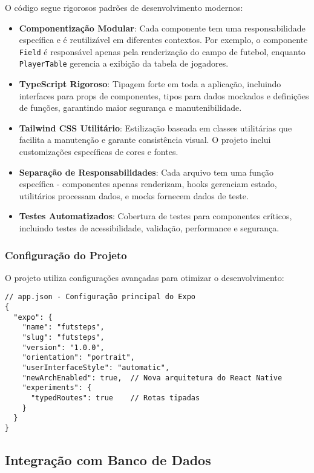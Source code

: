 O código segue rigorosos padrões de desenvolvimento modernos:

\begin{itemize}
    \item \textbf{Componentização Modular}: Cada componente tem uma responsabilidade específica e é reutilizável em diferentes contextos. Por exemplo, o componente \texttt{Field} é responsável apenas pela renderização do campo de futebol, enquanto \texttt{PlayerTable} gerencia a exibição da tabela de jogadores.
    
    \item \textbf{TypeScript Rigoroso}: Tipagem forte em toda a aplicação, incluindo interfaces para props de componentes, tipos para dados mockados e definições de funções, garantindo maior segurança e manutenibilidade.
    
    \item \textbf{Tailwind CSS Utilitário}: Estilização baseada em classes utilitárias que facilita a manutenção e garante consistência visual. O projeto inclui customizações específicas de cores e fontes.
    
    \item \textbf{Separação de Responsabilidades}: Cada arquivo tem uma função específica - componentes apenas renderizam, hooks gerenciam estado, utilitários processam dados, e mocks fornecem dados de teste.
    
    \item \textbf{Testes Automatizados}: Cobertura de testes para componentes críticos, incluindo testes de acessibilidade, validação, performance e segurança.
\end{itemize}

\subsubsection{Configuração do Projeto}

O projeto utiliza configurações avançadas para otimizar o desenvolvimento:

\begin{verbatim}
// app.json - Configuração principal do Expo
{
  "expo": {
    "name": "futsteps",
    "slug": "futsteps",
    "version": "1.0.0",
    "orientation": "portrait",
    "userInterfaceStyle": "automatic",
    "newArchEnabled": true,  // Nova arquitetura do React Native
    "experiments": {
      "typedRoutes": true    // Rotas tipadas
    }
  }
}
\end{verbatim}

\subsection{Integração com Banco de Dados}

